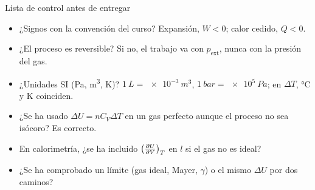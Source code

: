 \begin{recuadro}{Lista de control antes de entregar}
\begin{itemize}[label={\color{acento}$\blacktriangleright$},leftmargin=1.4em,itemsep=4pt]
\item ¿Signos con la convención del curso? Expansión, $W<0$; calor cedido, $Q<0$.
\item ¿El proceso es reversible? Si no, el trabajo va con $p_{\mathrm{ext}}$, nunca con la presión del gas.
\item ¿Unidades SI (\si{Pa}, \si{m^3}, \si{K})? $\SI{1}{L}=\SI{e-3}{m^3}$, $\SI{1}{bar}=\SI{e5}{Pa}$; en $\Delta T$, °C y K coinciden.
\item ¿Se ha usado $\Delta U=nC_V\Delta T$ en un gas perfecto aunque el proceso no sea isócoro? Es correcto.
\item En calorimetría, ¿se ha incluido $\bigl(\tfrac{\partial U}{\partial V}\bigr)_{T}$ en $l$ si el gas no es ideal?
\item ¿Se ha comprobado un límite (gas ideal, Mayer, $\gamma$) o el mismo $\Delta U$ por dos caminos?
\end{itemize}
\end{recuadro}
